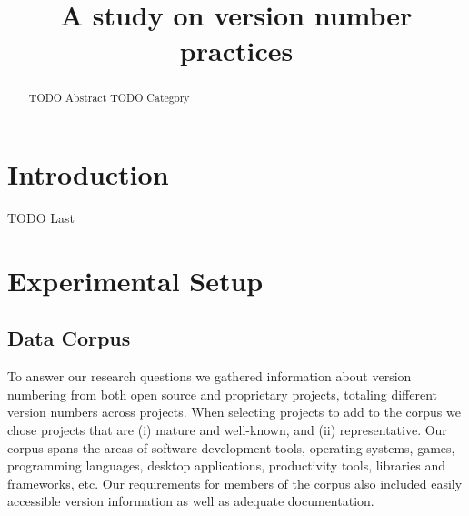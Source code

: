 \documentclass[conference]{IEEEtran}
\begin{document}
\title{A study on version number practices}

\author{}


\maketitle

\thispagestyle{plain}
\pagestyle{plain}

\begin{abstract}
 TODO Abstract
 TODO Category
 \end{abstract}


\IEEEpeerreviewmaketitle

\section{Introduction}
TODO Last



\section{Experimental Setup}

\subsection{Data Corpus}

\par To answer our research questions we gathered information about version numbering from both open source and proprietary projects, totaling \TotalVNs different version numbers across \TotalNumProjects projects. When selecting projects to add to the corpus we chose
projects that are (i) mature and well-known, and (ii) representative. Our corpus spans the areas of software development tools, operating systems, games, programming languages, desktop applications, productivity tools, libraries and frameworks, etc. 
Our requirements for members of the corpus also included easily accessible version information as well as adequate documentation.
\end{document}
